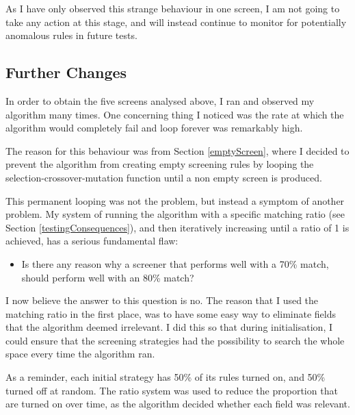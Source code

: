 \noindent As I have only observed this strange behaviour in one screen, I am not going to take any action at this stage, and will instead continue to monitor for potentially anomalous rules in future tests.

\subsection{Further Changes}
In order to obtain the five screens analysed above, I ran and observed my algorithm many times. One concerning thing I noticed was the rate at which the algorithm would completely fail and loop forever was remarkably high. \newline

The reason for this behaviour was from Section \ref{emptyScreen}, where I decided to prevent the algorithm from creating empty screening rules by looping the selection-crossover-mutation function until a non empty screen is produced. \newline

This permanent looping was not the problem, but instead a symptom of another problem. My system of running the algorithm with a specific matching ratio (see Section \ref{testingConsequences}), and then iteratively increasing until a ratio of 1 is achieved, has a serious fundamental flaw:
\begin{itemize}
    \item Is there any reason why a screener that performs well with a 70\% match, should perform well with an 80\% match?
\end{itemize}

I now believe the answer to this question is no. The reason that I used the matching ratio in the first place, was to have some easy way to eliminate fields that the algorithm deemed irrelevant. I did this so that during initialisation, I could ensure that the screening strategies had the possibility to search the whole space every time the algorithm ran. \newline

As a reminder, each initial strategy has 50\% of its rules turned on, and 50\% turned off at random. The ratio system was used to reduce the proportion that are turned on over time, as the algorithm decided whether each field was relevant. \newline

